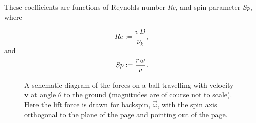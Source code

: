 \documentclass[a4paper]{article}
\begin{document}
These coefficients are functions of Reynolds number \textit{Re}, and spin parameter \textit{Sp}, where

\begin{equation} \label{eq:Re}
Re :=  \frac{v\,D}{\nu_{k}},
\end{equation}
%
and 
%
\begin{equation} \label{eq:Sp}
S\!{\kern 0.125em}p :=  \frac{r\,\omega}{v}.
\end{equation}
%
\setlength{\unitlength}{4cm}
\begin{center}
\begin{figure}
\begin{center}
\begin{minipage}[c]{12.25cm}
\caption{A schematic diagram of the forces on a ball travelling with velocity $\textbf{v}$ at angle $\theta$ to the ground (magnitudes are of course not to scale).  Here the lift force is drawn for backspin, $\vec{\omega}$, with the spin axis orthogonal to the plane of the page and pointing out of the page.}\par
\end{minipage}
\end{center}
\end{figure}
\end{center}
\end{document}

